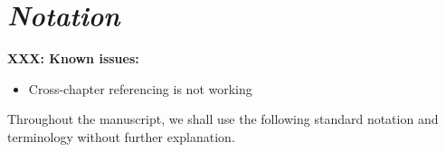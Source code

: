 \documentclass[nobib, a4paper, notoc, twoside, justified, openany]{tufte-book}
\begin{document}







\begin{fullwidth}
  \setcounter{tocdepth}{3}

\dominitoc%
\tableofcontents
\end{fullwidth}

\clearpage
{\section*{\Huge \it Notation}}
\label{sec:notations}

\textbf{XXX: Known issues:}
\begin{itemize}
\item  Cross-chapter referencing is not working
\end{itemize}


Throughout the manuscript, we shall use the following standard notation
and terminology without further explanation.
\end{document}
